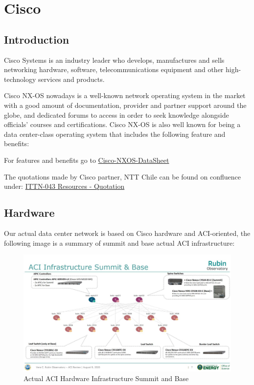 \section{Cisco}

\subsection{Introduction}

Cisco Systems is an industry leader who develops, manufactures and sells networking hardware, software, telecommunications equipment and other high-technology services and products. 

Cisco NX-OS nowadays is a  well-known network operating system in the market with a good amount of documentation, provider and partner support around the globe, and dedicated forums to access in order to seek knowledge alongside officials’ courses and certifications. Cisco NX-OS is also well known for being a data center-class operating system that includes the following feature and benefits:

For features and benefits go to \href{https://www.cisco.com/c/en/us/products/collateral/ios-nx-os-software/nx-os-software/data_sheet_c78-652063.pdf}{Cisco-NXOS-DataSheet}

The quotations made by Cisco partner, NTT Chile can be found on confluence under: \href{https://confluence.lsstcorp.org/display/IT/ITTN-043+-+Rubin+Network+Re-Engineering}{ITTN-043 Resources - Quotation}

\subsection{Hardware}

Our actual data center network is based on Cisco hardware and ACI-oriented, the following image is a summary of summit and base actual ACI infrastructure:


\begin{figure}
    \centering
    \includegraphics{images/aci-infrastructure-summit-and-base.jpg}
    \caption{Actual ACI Hardware Infrastructure Summit and Base}
\end{figure}


